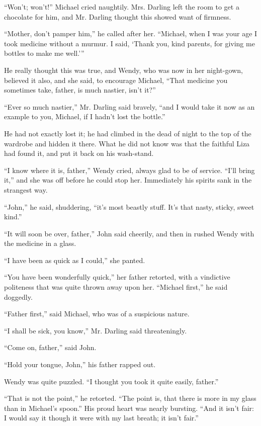``Won't; won't!'' Michael cried naughtily.
Mrs. Darling left the room to get a chocolate for him, and Mr. Darling thought
this showed want of firmness.

``Mother, don't pamper him,'' he called after her.
``Michael, when I was your age I took medicine without a murmur.
I said, `Thank you, kind parents, for giving me bottles to make me well.'''

He really thought this was true, and Wendy, who was now in her night-gown,
believed it also, and she said, to encourage Michael, ``That medicine you
sometimes take, father, is much nastier, isn't it?''

``Ever so much nastier,'' Mr. Darling said bravely, ``and I would take it now as
an example to you, Michael, if I hadn't lost the bottle.''

He had not exactly lost it; he had climbed in the dead of night to the top of
the wardrobe and hidden it there.
What he did not know was that the faithful Liza had found it, and put it back on
his wash-stand.

``I know where it is, father,'' Wendy cried, always glad to be of service.
``I'll bring it,'' and she was off before he could stop her.
Immediately his spirits sank in the strangest way.

``John,'' he said, shuddering, ``it's most beastly stuff.
It's that nasty, sticky, sweet kind.''

``It will soon be over, father,'' John said cheerily, and then in rushed
Wendy with the medicine in a glass.

``I have been as quick as I could,'' she panted.

``You have been wonderfully quick,'' her father retorted, with a vindictive
politeness that was quite thrown away upon her.
``Michael first,'' he said doggedly.

``Father first,'' said Michael, who was of a suspicious nature.

``I shall be sick, you know,'' Mr. Darling said threateningly.

``Come on, father,'' said John.

``Hold your tongue, John,'' his father rapped out.

Wendy was quite puzzled. ``I thought you took it quite easily, father.''

``That is not the point,'' he retorted.
``The point is, that there is more in my glass than in Michael's spoon.''
His proud heart was nearly bursting.
``And it isn't fair: I would say it though it were with my last breath; it isn't
fair.''

